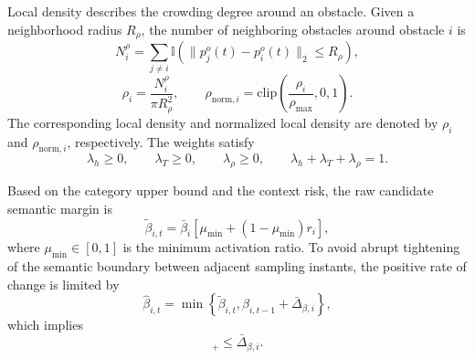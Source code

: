 \documentclass[journal]{IEEEtranTIE}
\begin{document}
    Local density describes the crowding degree around an obstacle. Given a
    neighborhood radius $R_\rho$, the number of neighboring obstacles around
    obstacle $i$ is
    \begin{equation}
    N_i^\rho=
    \sum_{j\neq i}
    \mathbb{I}\left(\|p_j^o(t)-p_i^o(t)\|_2\le R_\rho\right),
    \end{equation}
    \begin{equation}
    \rho_i=\frac{N_i^\rho}{\pi R_\rho^2},\qquad
    \rho_{\mathrm{norm},i}=
    \mathrm{clip}\left(\frac{\rho_i}{\rho_{\max}},0,1\right).
    \end{equation}
    The corresponding local density and normalized local density are denoted by
    $\rho_i$ and $\rho_{\mathrm{norm},i}$, respectively. The weights satisfy
    \begin{equation}
    \lambda_h\ge0,\qquad \lambda_T\ge0,\qquad
    \lambda_\rho\ge0,\qquad
    \lambda_h+\lambda_T+\lambda_\rho=1.
    \end{equation}

    Based on the category upper bound and the context risk, the raw candidate
    semantic margin is
    \begin{equation}
    \tilde{\beta}_{i,t}
    =\bar{\beta}_i
    \left[\mu_{\min}+(1-\mu_{\min})r_i\right],
    \end{equation}
    where $\mu_{\min}\in[0,1]$ is the minimum activation ratio. To avoid abrupt
    tightening of the semantic boundary between adjacent sampling instants, the
    positive rate of change is limited by
    \begin{equation}
    \hat{\beta}_{i,t}
    =
    \min\left\{
    \tilde{\beta}_{i,t},
    \beta_{i,t-1}+\bar{\Delta}_{\beta,i}
    \right\},
    \end{equation}
    which implies
    \begin{equation}
    [\hat{\beta}_{i,t}-\beta_{i,t-1}]_+
    \le \bar{\Delta}_{\beta,i}.
    \end{equation}
\end{document}

